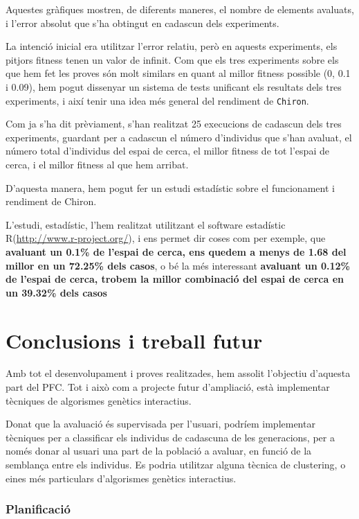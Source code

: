 	Aquestes gràfiques mostren, de diferents maneres, el nombre de elements
	avaluats, i l'error absolut que s'ha obtingut en cadascun dels experiments.

	La intenció inicial era utilitzar l'error relatiu, però en aquests
	experiments, els pitjors fitness tenen un valor de infinit.  Com que els
	tres experiments sobre els que hem fet les proves són molt similars en quant
	al millor fitness possible (0, 0.1 i 0.09), hem pogut dissenyar un
	sistema de tests unificant els resultats dels tres experiments, i així tenir
	una idea més general del rendiment de \texttt{Chiron}.

	Com ja s'ha dit prèviament, s'han  realitzat 25 execucions de cadascun dels
	tres experiments, guardant per a cadascun el número d'individus que s'han
	avaluat, el número total d'individus del espai de cerca, el millor fitness
	de tot l'espai de cerca, i el millor fitness al que hem arribat.

	D'aquesta manera, hem pogut fer un estudi estadístic sobre el funcionament i
	rendiment de Chiron.

	L'estudi, estadístic, l'hem realitzat utilitzant el software estadístic
	R(\url{http://www.r-project.org/}), i ens permet dir coses com per exemple,
	que \textbf{avaluant un 0.1\% de l'espai de cerca, ens quedem a menys de
	1.68 del millor en un 72.25\% dels casos}, o bé la més interessant 
	\textbf{avaluant un 0.12\% de l'espai de cerca, trobem la millor combinació
	del espai de cerca en un 39.32\% dels casos}

\section{Conclusions i treball futur} %
\label{sec:CConclusions i treball futur}

	Amb tot el desenvolupament i proves realitzades, hem assolit l'objectiu
	d'aquesta part del PFC.  Tot i això com a projecte futur
	d'ampliació, està implementar tècniques de algorismes genètics interactius.

	Donat que la avaluació és supervisada per l'usuari, podríem implementar
	tècniques per a classificar els individus de cadascuna de les generacions,
	per a només donar al usuari una part de la població a avaluar, en funció de
	la semblança entre els individus.  Es podria utilitzar alguna tècnica de
	clustering, o eines més particulars d'algorismes genètics interactius.

\subsubsection{Planificació} %
\label{ssub:CPlan}

